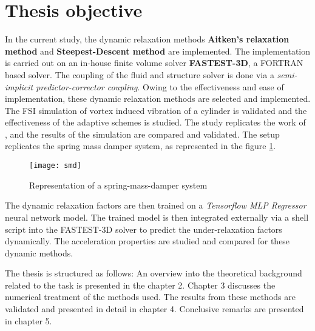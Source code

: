 \section{Thesis objective}
In the current study, the dynamic relaxation methods \textbf{Aitken's relaxation method} and \textbf{Steepest-Descent method} are implemented. The implementation is carried out on an in-house finite volume solver \textbf{FASTEST-3D}, a FORTRAN based solver. The coupling of the fluid and structure solver is done via a \textit{semi-implicit predictor-corrector coupling}. Owing to the effectiveness and ease of implementation, these dynamic relaxation methods are selected and implemented. The FSI simulation of vortex induced vibration of a cylinder is validated and the effectiveness of the adaptive schemes is studied. The study replicates the work of \citet{zhou1999vortex}, and the results of the simulation are compared and validated. The setup replicates the spring mass damper system, as represented in the figure \ref{fig:1.1}. 

\begin{figure}[h]
\centering
\texttt{[image: smd]}
\caption{Representation of a spring-mass-damper system}
\label{fig:1.1}
\end{figure} 

The dynamic relaxation factors are then trained on a \textit{Tensorflow MLP Regressor} neural network model. The trained model is then integrated externally via a shell script into the FASTEST-3D solver to predict the under-relaxation factors dynamically. The acceleration properties are studied and compared for these dynamic methods. 

The thesis is structured as follows: An overview into the theoretical background related to the task is presented in the chapter 2. Chapter 3 discusses the numerical treatment of the methods used. The results from these methods are validated and presented in detail in chapter 4. Conclusive remarks are presented in chapter 5.  

